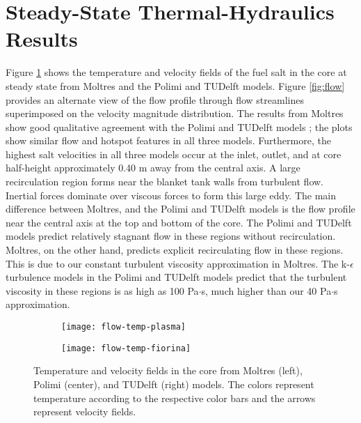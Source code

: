 \section{Steady-State Thermal-Hydraulics Results} \label{sec:ss-th}

Figure \ref{fig:flow-temp} shows the temperature and velocity fields of the
fuel salt in the core at steady state from Moltres and the Polimi and TUDelft
models. Figure \ref{fig:flow} provides an alternate view of the flow profile
through flow streamlines superimposed on the velocity magnitude distribution.
The results from Moltres show good qualitative agreement with the Polimi and
TUDelft models \cite{fiorina_modelling_2014}; the plots show similar
flow and hotspot features in all three models. Furthermore, the highest salt
velocities in all three models occur at the inlet, outlet, and at core
half-height approximately 0.40 m away from the central axis. A large
recirculation region forms near the blanket tank walls from turbulent flow.
Inertial forces dominate over viscous forces to form this large eddy. The main
difference between Moltres, and the Polimi and TUDelft models is the flow
profile near the central axis at the top and bottom of the core.
The Polimi and TUDelft models predict relatively stagnant flow in these
regions without recirculation. Moltres, on the other hand, predicts explicit
recirculating flow in these regions. This is due to our constant turbulent
viscosity approximation in Moltres. The k-$\epsilon$ turbulence models in the
Polimi and TUDelft models predict that the turbulent viscosity in these
regions is as high as 100 Pa$\cdot$s, much higher than our 40 Pa$\cdot$s
approximation.

\begin{figure}[htbp!]
    \centering
    \begin{subfigure}[t]{.35\textwidth}
        \centering
        \texttt{[image: flow-temp-plasma]}
    \end{subfigure}
    \hfill
    \begin{subfigure}[t]{.625\textwidth}
        \centering
        \texttt{[image: flow-temp-fiorina]}
    \end{subfigure}
    \caption{Temperature and velocity fields in the core from Moltres
    (left), Polimi (center), and TUDelft (right) models. The colors represent
    temperature according to the respective color bars and the arrows
    represent velocity fields.}
    \label{fig:flow-temp}
\end{figure}

